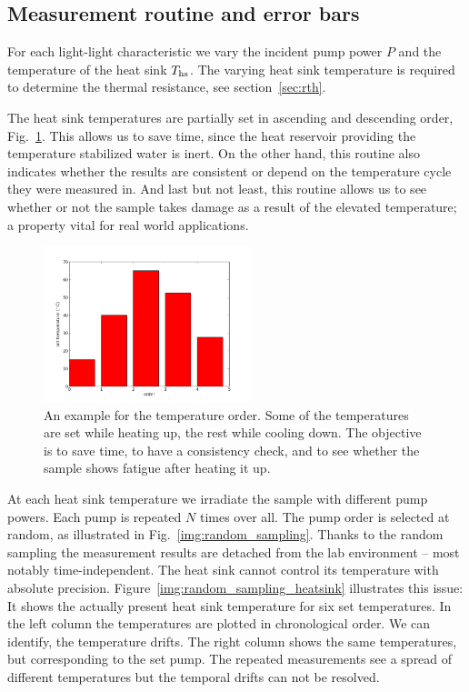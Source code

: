 \subsection{Measurement routine and error bars}
\label{sec:exp:measroutine}

For each light-light characteristic
we vary the incident pump power $P$
and the temperature of the heat sink $T_\mathrm{hs}$.
The varying heat sink temperature
is required to determine
the thermal resistance,
see section~\ref{sec:rth}.

The heat sink temperatures are partially set
in ascending and descending order, Fig.~\ref{img:temp_order}.
This allows us to save time,
since the heat reservoir
providing the temperature stabilized water
is inert.
On the other hand,
this routine also indicates
whether the results are consistent
or depend on the temperature cycle
they were measured in.
And last but not least,
this routine allows us
to see whether or not
the sample takes damage
as a result of the elevated temperature;
a property vital for real world applications.

\begin{figure}
\centering
\includegraphics[width=6cm]{img/temp_order.png}
\caption{An example for the temperature order.
Some of the temperatures
are set
while heating up,
the rest while cooling down.
The objective is to save time,
to have a consistency check,
and to see whether the sample
shows fatigue after heating it up.}
\label{img:temp_order}
\end{figure}

At each heat sink temperature
we irradiate the sample
with different pump powers.
Each pump is repeated $N$ times over all.
The pump order is selected at random,
as illustrated in Fig.~\ref{img:random_sampling}.
Thanks to the random sampling
the measurement results
are detached from the lab environment --
most notably time-independent.
The heat sink cannot control its temperature
with absolute precision.
Figure~\ref{img:random_sampling_heatsink}
illustrates this issue:
It shows
the actually present heat sink temperature
for six set temperatures.
In the left column
the temperatures are plotted
in chronological order.
We can identify,
the temperature drifts.
The right column shows the same temperatures,
but corresponding to the set pump.
The repeated measurements
see a spread of different temperatures
but the temporal drifts can not be resolved.

